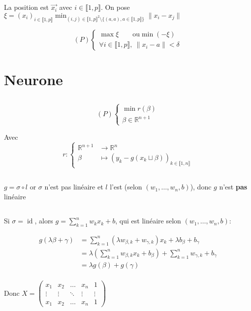 \documentclass{article}
\newcommand{\R}{\mathbb{R}}
\begin{document}
\subsection{}

La position est $\vec{x_i}$ avec $i\in \llbracket 1, p \rrbracket$.
On pose $\xi = (x_i)_{i\in \llbracket 1, p \rrbracket } \min_{(i, j) \in \llbracket 1, p \rrbracket^2 \setminus \{(a, a), a \in \llbracket 1, p\rrbracket\}   } \|x_i - x_j\|$

\[
	(P) \begin{cases}
		\max \xi \qquad \text{ou} \min (-\xi) \\
		\forall i\in \llbracket 1, p\rrbracket,\ \|x_i - a\| < \delta
	\end{cases}
\] 

\section{Neurone}

\subsection{}


\[
	(P) \begin{cases}
		\min r(\beta) \\
		\beta \in \R^{n+1}
	\end{cases}
\] 

Avec
\[
	r: \begin{cases}
		\R^{n+1} &\to \R^{n} \\
		\beta &\mapsto (y_k - g(x_k \sqcup \beta))_{k\in \llbracket 1, n \rrbracket}
	\end{cases}
\] 

\subsection{}

$g = \sigma \circ l$ or $\sigma$ n'est pas linéaire et $l$ l'est (selon $(w_1, \ldots, w_n, b)$), donc $g$ n'est {\bf pas} linéaire

\subsection{}

Si $\sigma = \operatorname{id}$, alors $g = \sum_{k=1}^{n} w_k x_k + b$, qui est linéaire selon $(w_1, \ldots, w_n, b)$:

\begin{align*}
	g(\lambda \beta + \gamma) &= \sum_{k=1}^{n} (\lambda w_{\beta, k} + w_{\gamma, k}) x_k + \lambda b_{\beta} + b_\gamma \\
	&= \lambda \left( \sum_{k=1}^{n} w_{\beta, k} x_k + b_\beta \right) + \sum_{k=1}^{n} w_{\gamma, k} + b_\gamma \\
	&= \lambda g(\beta) + g(\gamma) \\
\end{align*}

Donc $X = \begin{pmatrix} x_1 & x_2 & \ldots & x_n & 1 \\ \vdots & \vdots & \ddots & \vdots & \vdots \\ x_1 & x_2 & \ldots & x_n & 1 \end{pmatrix} $
\end{document}
